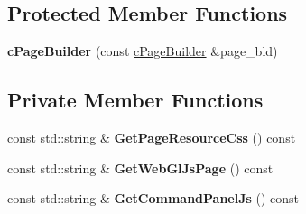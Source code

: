 \subsection*{\-Protected \-Member \-Functions}
\begin{DoxyCompactItemize}
\item 
\hypertarget{classhttp__server_1_1cPageBuilder_a3f3d04425b2f912c5616362b9be5d19e}{
{\bfseries c\-Page\-Builder} (const \hyperlink{classhttp__server_1_1cPageBuilder}{c\-Page\-Builder} \&page\-\_\-bld)}
\label{classhttp__server_1_1cPageBuilder_a3f3d04425b2f912c5616362b9be5d19e}

\end{DoxyCompactItemize}
\subsection*{\-Private \-Member \-Functions}
\begin{DoxyCompactItemize}
\item 
\hypertarget{classhttp__server_1_1cPageBuilder_af13a8d2da68df5dcb3e5804f968ac2cd}{
const std\-::string \& {\bfseries \-Get\-Page\-Resource\-Css} () const }
\label{classhttp__server_1_1cPageBuilder_af13a8d2da68df5dcb3e5804f968ac2cd}

\item 
\hypertarget{classhttp__server_1_1cPageBuilder_a5ebfe434b953025cced089248bb64bf2}{
const std\-::string \& {\bfseries \-Get\-Web\-Gl\-Js\-Page} () const }
\label{classhttp__server_1_1cPageBuilder_a5ebfe434b953025cced089248bb64bf2}

\item 
\hypertarget{classhttp__server_1_1cPageBuilder_ad42b2d53306216563fa70f7fa1bd1cae}{
const std\-::string \& {\bfseries \-Get\-Command\-Panel\-Js} () const }
\label{classhttp__server_1_1cPageBuilder_ad42b2d53306216563fa70f7fa1bd1cae}

\end{DoxyCompactItemize}
